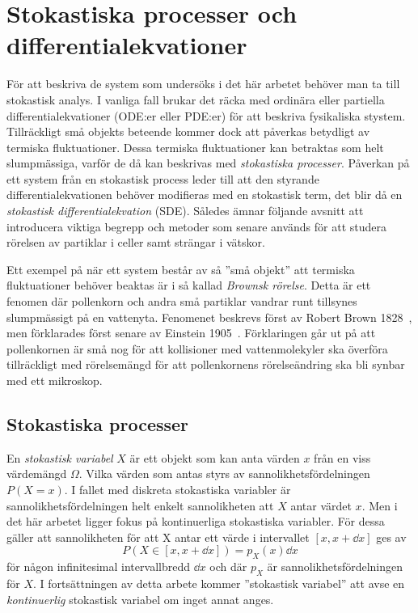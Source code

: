 \chapter{Stokastiska processer och differentialekvationer}

För att beskriva de system som undersöks i det här arbetet
behöver man ta till stokastisk analys. I vanliga fall brukar
det räcka med ordinära eller partiella differential\-ekvationer (ODE:er
eller PDE:er) för att beskriva fysikaliska stystem. Tillräckligt små objekts beteende kommer dock att påverkas betydligt av termiska fluktuationer. Dessa termiska fluktuationer kan betraktas som helt
slumpmässiga, varför de då kan beskrivas med \emph{stokastiska processer}. Påverkan på ett system från en stokastisk process leder
till att den styrande differentialekvationen behöver modifieras med en stokastisk term,
det blir då en \emph{stokastisk differentialekvation} (SDE). Således 
ämnar följande avsnitt att introducera viktiga begrepp och metoder 
som senare används för att studera rörelsen av partiklar i celler samt 
strängar i vätskor. 

Ett exempel på när ett system består av så ''små objekt'' att termiska
fluktuationer behöver beaktas är i så kallad \emph{Brownsk rörelse}. 
Detta är ett fenomen där pollenkorn och andra små partiklar vandrar
runt tillsynes slumpmässigt på en vattenyta. Fenomenet beskrevs först av Robert Brown
1828~\cite{Brown1828}, men förklarades först senare av Einstein
1905~\cite{Einstein1905}. Förklaringen går ut på att pollenkornen är
små nog för att kollisioner med vattenmolekyler ska överföra
tillräckligt med rörelsemängd för att pollenkornens rörelseändring ska bli synbar med ett mikroskop. 


\section{Stokastiska processer}
En \emph{stokastisk variabel} $X$ är ett objekt som kan anta värden
$x$ från en viss värdemängd $\Omega$. Vilka värden som antas styrs av
sannolikhetsfördelningen $P(X=x)$. I fallet med diskreta stokastiska
variabler är sannolikhetsfördelningen helt enkelt sannolikheten att
$X$ antar värdet $x$. Men i det här arbetet ligger fokus på
kontinuerliga stokastiska variabler. För dessa gäller att sannolikheten för att X antar ett värde i intervallet $[x, x+\dd{x}]$ ges av
\begin{equation}
P(X\in[x, x+\dd{x}]) =p_X(x)\dd{x}
\end{equation}
för någon infinitesimal intervallbredd $\dd{x}$ och där $p_X$ är sannolikhetsfördelningen för $X$. 
I fortsättningen av detta arbete kommer ''stokastisk variabel'' att
avse en \emph{kontinuerlig} stokastisk variabel om inget annat anges.


